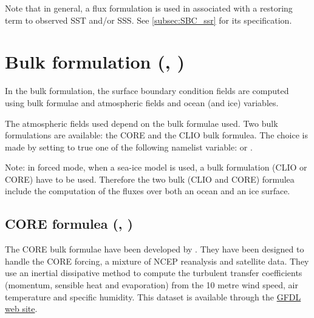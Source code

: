 \documentclass[../main/NEMO_manual]{subfiles}
\begin{document}
Note that in general, a flux formulation is used in associated with a restoring term to observed SST and/or SSS.
See \autoref{subsec:SBC_ssr} for its specification.


\section[Bulk formulation {(\textit{sbcblk\{\_core,\_clio\}.F90})}]
                        {Bulk formulation {(\protect{}, \protect{})}}
\label{sec:SBC_blk}

In the bulk formulation, the surface boundary condition fields are computed using bulk formulae and atmospheric fields and ocean (and ice) variables.

The atmospheric fields used depend on the bulk formulae used.
Two bulk formulations are available:
the CORE and the CLIO bulk formulea.
The choice is made by setting to true one of the following namelist variable:
 or .

Note:
in forced mode, when a sea-ice model is used, a bulk formulation (CLIO or CORE) have to be used.
Therefore the two bulk (CLIO and CORE) formulea include the computation of the fluxes over
both an ocean and an ice surface. 

\subsection{CORE formulea (\protect{}, \protect{})}
\label{subsec:SBC_blk_core}
%

The CORE bulk formulae have been developed by \citet{Large_Yeager_Rep04}.
They have been designed to handle the CORE forcing, a mixture of NCEP reanalysis and satellite data.
They use an inertial dissipative method to compute the turbulent transfer coefficients
(momentum, sensible heat and evaporation) from the 10 metre wind speed, air temperature and specific humidity.
This \citet{Large_Yeager_Rep04} dataset is available through
the \href{http://nomads.gfdl.noaa.gov/nomads/forms/mom4/CORE.html}{GFDL web site}.
\end{document}
